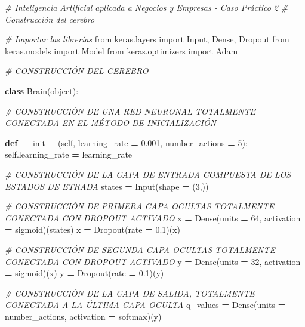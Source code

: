 \documentclass[
]{book}
\newenvironment{Shaded}{\begin{snugshade}}{\end{snugshade}}
\newcommand{\BuiltInTok}[1]{#1}
\newcommand{\CommentTok}[1]{\textcolor[rgb]{0.56,0.35,0.01}{\textit{#1}}}
\newcommand{\DecValTok}[1]{\textcolor[rgb]{0.00,0.00,0.81}{#1}}
\newcommand{\FloatTok}[1]{\textcolor[rgb]{0.00,0.00,0.81}{#1}}
\newcommand{\FunctionTok}[1]{\textcolor[rgb]{0.00,0.00,0.00}{#1}}
\newcommand{\ImportTok}[1]{#1}
\newcommand{\KeywordTok}[1]{\textcolor[rgb]{0.13,0.29,0.53}{\textbf{#1}}}
\newcommand{\NormalTok}[1]{#1}
\newcommand{\OperatorTok}[1]{\textcolor[rgb]{0.81,0.36,0.00}{\textbf{#1}}}
\newcommand{\StringTok}[1]{\textcolor[rgb]{0.31,0.60,0.02}{#1}}
\newcommand{\VariableTok}[1]{\textcolor[rgb]{0.00,0.00,0.00}{#1}}
\begin{document}
\begin{Shaded}
\begin{Highlighting}[]
\CommentTok{\# Inteligencia Artificial aplicada a Negocios y Empresas {-} Caso Práctico 2}
\CommentTok{\# Construcción del cerebro}

\CommentTok{\# Importar las librerías}
\ImportTok{from}\NormalTok{ keras.layers }\ImportTok{import}\NormalTok{ Input, Dense, Dropout}
\ImportTok{from}\NormalTok{ keras.models }\ImportTok{import}\NormalTok{ Model}
\ImportTok{from}\NormalTok{ keras.optimizers }\ImportTok{import}\NormalTok{ Adam}

\CommentTok{\# CONSTRUCCIÓN DEL CEREBRO}

\KeywordTok{class}\NormalTok{ Brain(}\BuiltInTok{object}\NormalTok{):}
    
    \CommentTok{\# CONSTRUCCIÓN DE UNA RED NEURONAL TOTALMENTE CONECTADA EN EL MÉTODO DE INICIALIZACIÓN}
    
    \KeywordTok{def} \FunctionTok{\_\_init\_\_}\NormalTok{(}\VariableTok{self}\NormalTok{, learning\_rate }\OperatorTok{=} \FloatTok{0.001}\NormalTok{, number\_actions }\OperatorTok{=} \DecValTok{5}\NormalTok{):}
        \VariableTok{self}\NormalTok{.learning\_rate }\OperatorTok{=}\NormalTok{ learning\_rate}
        
        \CommentTok{\# CONSTRUCCIÓN DE LA CAPA DE ENTRADA COMPUESTA DE LOS ESTADOS DE ETRADA}
\NormalTok{        states }\OperatorTok{=}\NormalTok{ Input(shape }\OperatorTok{=}\NormalTok{ (}\DecValTok{3}\NormalTok{,))}
        
        \CommentTok{\# CONSTRUCCIÓN DE PRIMERA CAPA OCULTAS TOTALMENTE CONECTADA CON DROPOUT ACTIVADO}
\NormalTok{        x }\OperatorTok{=}\NormalTok{ Dense(units }\OperatorTok{=} \DecValTok{64}\NormalTok{, activation }\OperatorTok{=} \StringTok{\textquotesingle{}sigmoid\textquotesingle{}}\NormalTok{)(states)}
\NormalTok{        x }\OperatorTok{=}\NormalTok{ Dropout(rate }\OperatorTok{=} \FloatTok{0.1}\NormalTok{)(x)}

        \CommentTok{\# CONSTRUCCIÓN DE SEGUNDA CAPA OCULTAS TOTALMENTE CONECTADA CON DROPOUT ACTIVADO}
\NormalTok{        y }\OperatorTok{=}\NormalTok{ Dense(units }\OperatorTok{=} \DecValTok{32}\NormalTok{, activation }\OperatorTok{=} \StringTok{\textquotesingle{}sigmoid\textquotesingle{}}\NormalTok{)(x)}
\NormalTok{        y }\OperatorTok{=}\NormalTok{ Dropout(rate }\OperatorTok{=} \FloatTok{0.1}\NormalTok{)(y)}

        \CommentTok{\# CONSTRUCCIÓN DE LA CAPA DE SALIDA, TOTALMENTE CONECTADA A LA ÚLTIMA CAPA OCULTA}
\NormalTok{        q\_values }\OperatorTok{=}\NormalTok{ Dense(units }\OperatorTok{=}\NormalTok{ number\_actions, activation }\OperatorTok{=} \StringTok{\textquotesingle{}softmax\textquotesingle{}}\NormalTok{)(y)}
        

\end{Highlighting}
\end{Shaded}
\end{document}
